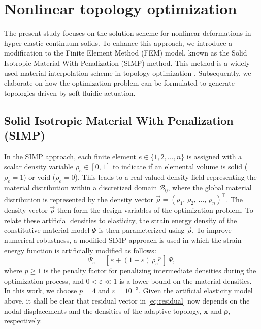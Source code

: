 \vspace{-2mm}
\section{Nonlinear topology optimization}
\label{sec:C1:topo} 
The present study focuses on the solution scheme for nonlinear deformations in hyper-elastic continuum solids. To enhance this approach, we introduce a modification to the Finite Element Method (FEM) model, known as the Solid Isotropic Material With Penalization (SIMP) method. This method is a widely used material interpolation scheme in topology optimization \cite{Bendsoe2003,Gain2013Dec,Talischi2012Mar,Vasista2013Jul}. Subsequently, we elaborate on how the optimization problem can be formulated to generate topologies driven by soft fluidic actuation.

\subsection{Solid Isotropic Material With Penalization (SIMP)}
In the SIMP approach, each finite element $e \in \{1,2,...,n\}$ is assigned with a scalar density variable $\rho_e \in [0,1]$ to indicate if an elemental volume is solid ($\rho_e = 1$) or void ($\rho_e = 0$). This leads to a real-valued density field representing the material distribution within a discretized domain $\mathcal{B}_0$, where the global material distribution is represented by the density vector $\vec{\rho} = \left(\rho_1,\,\rho_2,\,...,\,\rho_{n}\right)^\top$. The density vector $\vec{\rho}$ then form the design variables of the optimization problem. To relate these artificial densities to elasticity, the strain energy density of the constitutive material model ${\Psi}$ is then parameterized using $\vec{\rho}$. To improve numerical robustness, a modified SIMP approach is used in which the strain-energy function is artificially modified as follows:
%
\begin{equation}
{\Psi}_e = [\,\varepsilon + (1-\varepsilon)\,{\rho_e}^p\,]\, {\Psi}, \label{eq:simp}
\end{equation}
%
where $p\ge 1$ is the penalty factor for penalizing intermediate densities during the optimization process, and $0 < \varepsilon \ll 1$ is a lower-bound on the material densities. In this work, we choose $p = 4$ and $\varepsilon = 10^{-3}$. Given the artificial elasticity model above, it shall be clear that residual vector in \eqref{eq:residual} now depends on the nodal displacements and the densities of the adaptive topology, $\boldsymbol{x}$ and $\boldsymbol{\rho}$, respectively.

